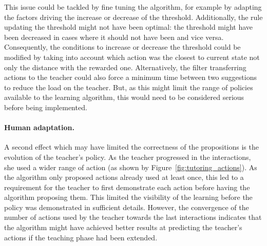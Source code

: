 This issue could be tackled by fine tuning the algorithm, for example by adapting the factors driving the increase or decrease of the threshold. Additionally, the rule updating the threshold might not have been optimal: the threshold might have been decreased in cases where it should not have been and vice versa. Consequently, the conditions to increase or decrease the threshold could be modified by taking into account which action was the closest to current state not only the distance with the rewarded one.
Alternatively, the filter transferring actions to the teacher could also force a minimum time between two suggestions to reduce the load on the teacher. But, as this might limit the range of policies available to the learning algorithm, this would need to be considered serious before being implemented.

\paragraph{Human adaptation.}
A second effect which may have limited the correctness of the propositions is the evolution of the teacher's policy. As the teacher progressed in the interactions, she used a wider range of action (as shown by Figure~\ref{fig:tutoring_actions}). As the algorithm only proposed actions already used at least once, this led to a requirement for the teacher to first demonstrate each action before having the algorithm proposing them. This limited the visibility of the learning before the policy was demonstrated in sufficient details. However, the convergence of the number of actions used by the teacher towards the last interactions indicates that the algorithm might have achieved better results at predicting the teacher's actions if the teaching phase had been extended.

